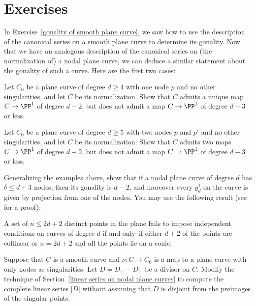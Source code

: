 \section{Exercises}

In Exercise~\ref{gonality of smooth plane curve}, we saw how to use the
%
description of the canonical series on a smooth plane curve to determine its
gonality.
Now that we have an analogous description of the canonical
series on (the normalization of) a nodal plane curve, we can deduce a
similar statement about the gonality of such a curve. Here are the first
two cases:

\begin{exercise}
Let $C_0$ be a plane curve of degree $d\geq 4$ with one node $p$ and no
other singularities, and let $C$ be its normalization. Show that $C$
admits a unique map $C \to \PP^1$ of degree $d-2$, but does not admit
%
a map $C \to \PP^1$ of degree $d-3$ or less.
\end{exercise}

\begin{exercise}
Let $C_0$ be a plane curve of degree $d\geq 5$ with two nodes $p$ and $p'$
and no other singularities, and let $C$ be its normalization. Show that
%
$C$ admits two maps $C \to \PP^1$ of degree $d-2$, but does not admit
a map $C \to \PP^1$ of degree $d-3$ or less.
\end{exercise}

\begin{exercise}
Generalizing the examples above, show that if a nodal plane curve of
degree $d$ has $\delta\leq d+3$ nodes,
then its gonality is $d-2$, and moreover every
$g^1_d$
%
on the curve is
given by projection from one of the nodes.
You may use the following result
(see \cite[p.~302]{MR1376653} for a proof):

\begin{proposition}\label{independent conditions}
 A set of $n \leq 2d+ 2$ distinct
points in the plane fails to impose independent conditions on curves
of degree
$d$ if and only~if either $d + 2$ of the points  are collinear or $n =
2d + 2$ and all the points lie
on a conic.
\end{proposition}
\end{exercise}

\begin{exercise}\label{general case of divisors on nodal curves}
Suppose that $C$ is a smooth curve and $\nu: C \to C_0$ is a map to a
plane curve with
only nodes as singularities. Let $D = D_{+}-D_{-}$ be a divisor on
$C$. Modify the
technique of Section~\ref{linear series on nodal plane curves} to compute
the
complete linear series
$|D|$ without assuming that $D$ is disjoint from the
%
preimages of the singular
%
points.
\end{exercise}


